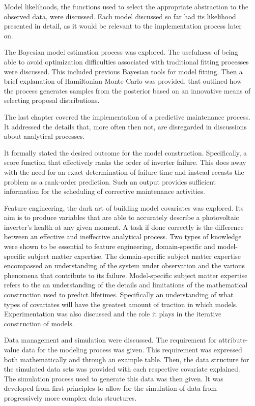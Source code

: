 Model likelihoods, the functions used to select the appropriate abstraction to the observed data, were discussed. Each model discussed so far had its likelihood presented in detail, as it would be relevant to the implementation process later on.

The Bayesian model estimation process was explored. The usefulness of being able to avoid optimization difficulties associated with traditional fitting processes were discussed. This included previous Bayesian tools for model fitting. Then a brief explanation of Hamiltonian Monte Carlo was provided, that outlined how the process generates samples from the posterior based on an innovative means of selecting proposal distributions.

The last chapter covered the implementation of a predictive maintenance process. It addressed the details that, more often then not, are disregarded in discussions about analytical processes. 

It formally stated the desired outcome for the model construction. Specifically, a score function that effectively ranks the order of inverter failure. This does away with the need for an exact determination of failure time and instead recasts the problem as a rank-order prediction. Such an output provides sufficient information for the scheduling of corrective maintenance activities. 

Feature engineering, the dark art of building model covariates was explored. Its aim is to produce variables that are able to accurately describe a photovoltaic inverter's health at any given moment. A task if done correctly is the difference between an effective and ineffective analytical process. Two types of knowledge were shown to be essential to feature engineering, domain-specific and model-specific subject matter expertise. The domain-specific subject matter expertise encompassed an understanding of the system under observation and the various phenomena that contribute to its failure. Model-specific subject matter expertise refers to the an understanding of the details and limitations of the mathematical construction used to predict lifetimes. Specifically an understanding of what types of covariates will have the greatest amount of traction in which models. Experimentation was also discussed and the role it plays in the iterative construction of models.

Data management and simulation were discussed. The requirement for attribute-value data for the modeling process was given. This requirement was expressed both mathematically and through an example table. Then, the data structure for the simulated data sets was provided with each respective covariate explained. The simulation process used to generate this data was then given. It was developed from first principles to allow for the simulation of data from progressively more complex data structures. 

